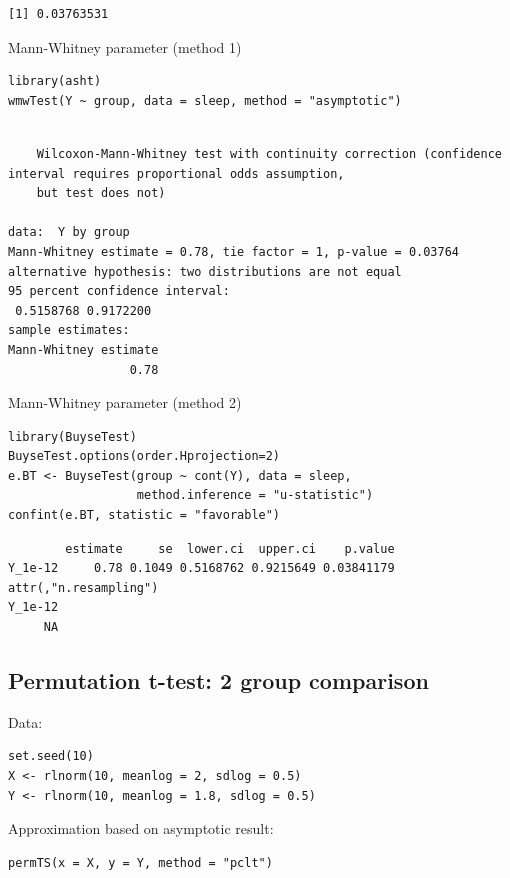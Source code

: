 \documentclass{article}
\begin{document}
\begin{verbatim}
[1] 0.03763531
\end{verbatim}


Mann-Whitney parameter (method 1)
\lstset{language=r,label= ,caption= ,captionpos=b,numbers=none}
\begin{lstlisting}
library(asht)
wmwTest(Y ~ group, data = sleep, method = "asymptotic")
\end{lstlisting}

\begin{verbatim}

	Wilcoxon-Mann-Whitney test with continuity correction (confidence interval requires proportional odds assumption,
	but test does not)

data:  Y by group
Mann-Whitney estimate = 0.78, tie factor = 1, p-value = 0.03764
alternative hypothesis: two distributions are not equal
95 percent confidence interval:
 0.5158768 0.9172200
sample estimates:
Mann-Whitney estimate 
                 0.78
\end{verbatim}

Mann-Whitney parameter (method 2)
\lstset{language=r,label= ,caption= ,captionpos=b,numbers=none}
\begin{lstlisting}
library(BuyseTest)
BuyseTest.options(order.Hprojection=2)
e.BT <- BuyseTest(group ~ cont(Y), data = sleep, 
                  method.inference = "u-statistic")
confint(e.BT, statistic = "favorable")
\end{lstlisting}

\begin{verbatim}
        estimate     se  lower.ci  upper.ci    p.value
Y_1e-12     0.78 0.1049 0.5168762 0.9215649 0.03841179
attr(,"n.resampling")
Y_1e-12 
     NA
\end{verbatim}

\subsection{Permutation t-test: 2 group comparison}
\label{sec:orgbd3958b}

Data:
\lstset{language=r,label= ,caption= ,captionpos=b,numbers=none}
\begin{lstlisting}
set.seed(10)
X <- rlnorm(10, meanlog = 2, sdlog = 0.5)
Y <- rlnorm(10, meanlog = 1.8, sdlog = 0.5)
\end{lstlisting}

Approximation based on asymptotic result:
\lstset{language=r,label= ,caption= ,captionpos=b,numbers=none}
\begin{lstlisting}
permTS(x = X, y = Y, method = "pclt")
\end{lstlisting}
\end{document}
